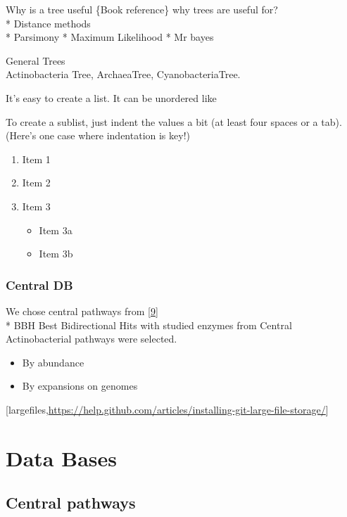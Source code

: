 \documentclass[12pt,twoside]{reedthesis}
\providecommand{\tightlist}{%
  \setlength{\itemsep}{0pt}\setlength{\parskip}{0pt}}
\begin{document}
  Why is a tree useful \{Book reference\} why trees are useful for?\\
  * Distance methods\\
  * Parsimony * Maximum Likelihood * Mr bayes
  
  General Trees\\
  Actinobacteria Tree, ArchaeaTree, CyanobacteriaTree.
  
  It's easy to create a list. It can be unordered like
  
  To create a sublist, just indent the values a bit (at least four spaces
  or a tab). (Here's one case where indentation is key!)
  
  \begin{enumerate}
  \def\labelenumi{\arabic{enumi}.}
  \tightlist
  \item
    Item 1
  \item
    Item 2
  \item
    Item 3
  
    \begin{itemize}
    \tightlist
    \item
      Item 3a
    \item
      Item 3b
    \end{itemize}
  \end{enumerate}
  
  \subsubsection{Central DB}\label{central-db}
  
  We chose central pathways from
  {[}\protect\hyperlink{ref-barona-gomez_what_2012}{9}{]}\\
  * BBH Best Bidirectional Hits with studied enzymes from Central
  Actinobacterial pathways were selected.
  
  \begin{itemize}
  \item
    By abundance
  \item
    By expansions on genomes
  \end{itemize}
  
  {[}largefiles,\url{https://help.github.com/articles/installing-git-large-file-storage/}{]}
  
  \section{Data Bases}\label{data-bases}
  
  \subsection{Central pathways}\label{central-pathways}
  
\end{document}
